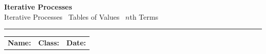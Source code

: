\documentclass[12pt,a4paper]{article}
\begin{document}

\begin{center}
  {\LARGE\bfseries\color{headgrey} Iterative Processes}\\[4pt]
  {\large Iterative Processes \textbullet\ Tables of Values \textbullet\ $n$th Terms}\\[8pt]
  \textcolor{lightgrey}{\rule{\linewidth}{1pt}}
\end{center}

\vspace{-2pt}
\noindent
\begin{tabularx}{\linewidth}{X X X}
  \textbf{Name:}\enspace\dotfill & \textbf{Class:}\enspace\dotfill & \textbf{Date:}\enspace\dotfill
\end{tabularx}

\vspace{10pt}
\end{document}
